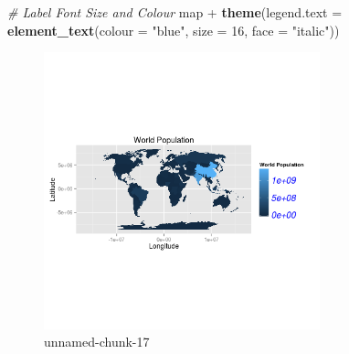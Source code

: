 \documentclass[]{article}
\newenvironment{Shaded}{}{}
\newcommand{\KeywordTok}[1]{\textcolor[rgb]{0.00,0.44,0.13}{\textbf{{#1}}}}
\newcommand{\DataTypeTok}[1]{\textcolor[rgb]{0.56,0.13,0.00}{{#1}}}
\newcommand{\DecValTok}[1]{\textcolor[rgb]{0.25,0.63,0.44}{{#1}}}
\newcommand{\StringTok}[1]{\textcolor[rgb]{0.25,0.44,0.63}{{#1}}}
\newcommand{\CommentTok}[1]{\textcolor[rgb]{0.38,0.63,0.69}{\textit{{#1}}}}
\newcommand{\NormalTok}[1]{{#1}}
\let\Oldincludegraphics\includegraphics
\renewcommand{\includegraphics}[1]{\Oldincludegraphics[width=8cm]{#1}}
\begin{document}
\begin{Shaded}
\begin{Highlighting}[]

\CommentTok{# Label Font Size and Colour}
\NormalTok{map + }\KeywordTok{theme}\NormalTok{(}\DataTypeTok{legend.text =} \KeywordTok{element_text}\NormalTok{(}\DataTypeTok{colour =} \StringTok{"blue"}\NormalTok{, }\DataTypeTok{size =} \DecValTok{16}\NormalTok{, }\DataTypeTok{face =} \StringTok{"italic"}\NormalTok{))}
\end{Highlighting}
\end{Shaded}
\begin{figure}[htbp]
\centering
\includegraphics{figure/unnamed-chunk-173.png}
\caption{unnamed-chunk-17}
\end{figure}
\end{document}
